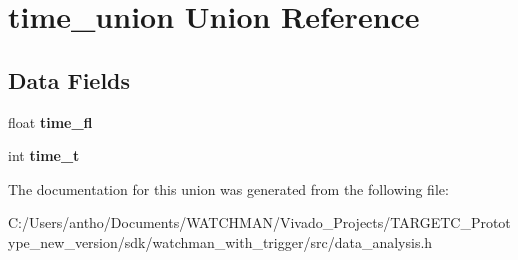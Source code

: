 \section{time\+\_\+union Union Reference}
\label{uniontime__union}
\subsection*{Data Fields}
\begin{DoxyCompactItemize}
\item 
\mbox{\label{uniontime__union_a8811908041d667d8e151a47a5edc24de}} 
float {\bfseries time\+\_\+fl}
\item 
\mbox{\label{uniontime__union_a5cdc7338037dabaa4cafccc0aa0adb05}} 
int {\bfseries time\+\_\+t}
\end{DoxyCompactItemize}


The documentation for this union was generated from the following file\+:\begin{DoxyCompactItemize}
\item 
C\+:/\+Users/antho/\+Documents/\+W\+A\+T\+C\+H\+M\+A\+N/\+Vivado\+\_\+\+Projects/\+T\+A\+R\+G\+E\+T\+C\+\_\+\+Prototype\+\_\+new\+\_\+version/sdk/watchman\+\_\+with\+\_\+trigger/src/data\+\_\+analysis.\+h\end{DoxyCompactItemize}
